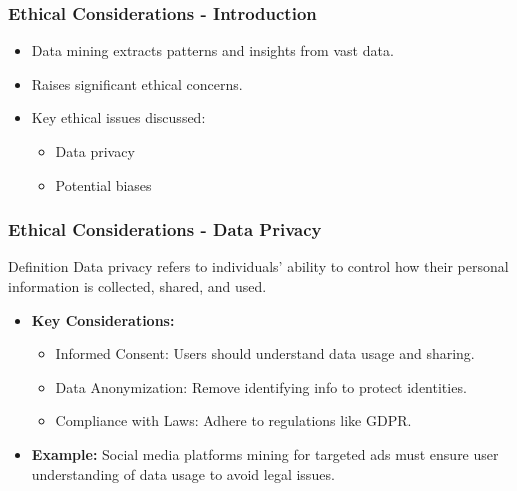\documentclass[aspectratio=169]{beamer}
\begin{document}
\begin{frame}[fragile]
    \frametitle{Ethical Considerations - Introduction}
    \begin{itemize}
        \item Data mining extracts patterns and insights from vast data.
        \item Raises significant ethical concerns.
        \item Key ethical issues discussed: 
        \begin{itemize}
            \item Data privacy
            \item Potential biases
        \end{itemize}
    \end{itemize}
\end{frame}

\begin{frame}[fragile]
    \frametitle{Ethical Considerations - Data Privacy}
    \begin{block}{Definition}
        Data privacy refers to individuals' ability to control how their personal information is collected, shared, and used.
    \end{block}
    \begin{itemize}
        \item \textbf{Key Considerations:}
        \begin{itemize}
            \item Informed Consent: Users should understand data usage and sharing.
            \item Data Anonymization: Remove identifying info to protect identities.
            \item Compliance with Laws: Adhere to regulations like GDPR.
        \end{itemize}
        \item \textbf{Example:} 
        Social media platforms mining for targeted ads must ensure user understanding of data usage to avoid legal issues.
    \end{itemize}
\end{frame}
\end{document}
